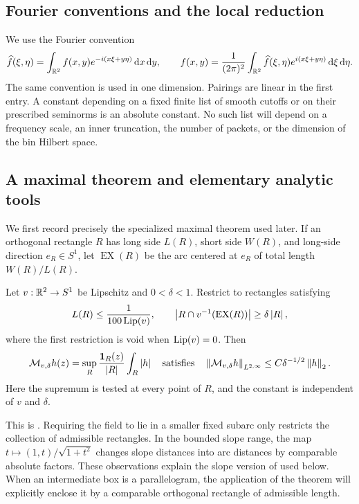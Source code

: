 \subsection{Fourier conventions and the local reduction}
\label{red:section}

We use the Fourier convention
\[
 \widehat f(\xi,\eta)
   =\int_{\mathbb R^2}f(x,y)e^{-i(x\xi+y\eta)}\,\mathrm d x\,\mathrm d y,
 \qquad
 f(x,y)=\frac1{(2\pi)^2}\int_{\mathbb R^2}
       \widehat f(\xi,\eta)e^{i(x\xi+y\eta)}\,\mathrm d\xi\,\mathrm d\eta.
\]
The same convention is used in one dimension. Pairings are linear in
the first entry. A constant depending on a fixed finite list of smooth
cutoffs or on their prescribed seminorms is an absolute constant.
No such list will depend on a frequency scale, an inner truncation,
the number of packets, or the dimension of the bin Hilbert space.

\subsection{A maximal theorem and elementary analytic tools}

We first record precisely the specialized maximal theorem used later.
If an orthogonal rectangle \(R\) has long side \(L(R)\), short side
\(W(R)\), and long-side direction \(e_R\in S^1\), let
\(\operatorname{EX}(R)\) be the arc centered at \(e_R\) of total
length \(W(R)/L(R)\).

\begin{theorem}[Lacey--Li]\label{red:kakeya}
Let \(v:\mathbb R^2\to S^1\) be Lipschitz and \(0<\delta<1\). Restrict to
rectangles satisfying
\[
 L(R)\le \frac1{100\operatorname{Lip}(v)},\qquad
 \left|R\cap v^{-1}(\operatorname{EX}(R))\right|\ge\delta\left|R\right|,
\]
where the first restriction is void when \(\operatorname{Lip}(v)=0\). Then
\[
 \mathcal M_{v,\delta}h(z)
   =\sup_R\frac{\mathbf 1_R(z)}{\left|R\right|}\int_R\left|h\right|
 \quad\text{satisfies}\quad
 \left\|\mathcal M_{v,\delta}h\right\|_{L^{2,\infty}}
       \le C\delta^{-1/2}\left\|h\right\|_2.
\]
Here the supremum is tested at every point of \(R\), and the constant
is independent of \(v\) and \(\delta\).
\end{theorem}

This is \cite[Theorem~1.4]{LLKakeya}. Requiring the field to lie in a
smaller fixed subarc only restricts the collection of admissible
rectangles. In the bounded slope range, the map
\(t\mapsto(1,t)/\sqrt{1+t^2}\) changes slope distances into arc
distances by comparable absolute factors. These observations explain
the slope version of  used below. When an intermediate
box is a parallelogram, the application of the theorem will explicitly
enclose it by a comparable orthogonal rectangle of admissible length.

